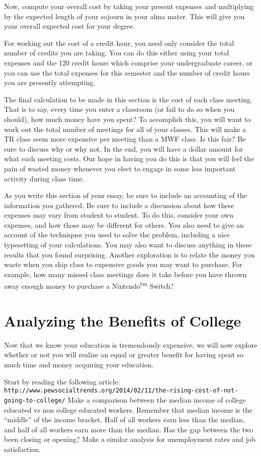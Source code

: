 \documentclass{article}
\begin{document}
Now, compute your overall cost by taking your present expenses and multiplying by the expected length of your sojourn in your alma mater.  This will give you your overall expected cost for your degree.

For working out the cost of a credit hour, you need only consider the total number of credits you are taking.  You can do this either using your total expenses and the 120 credit hours which comprise your undergraduate career, or you can use the total expenses for this semester and the number of credit hours you are presently attempting.

The final calculation to be made in this section is the cost of each class meeting.  That is to say, every time you enter a classroom (or fail to do so when you should), how much money have you spent?  To accomplish this, you will want to work out the total number of meetings for all of your classes.  This will make a TR class seem more expensive per meeting than a MWF class.  Is this fair?  Be sure to discuss why or why not.  In the end, you will have a dollar amount for what each meeting costs.  Our hope in having you do this is that you will feel the pain of wasted money whenever you elect to engage in some less important activity during class time.

As you write this section of your essay, be sure to include an accounting of the information you gathered.  Be sure to include a discussion about how these expenses may vary from student to student.  To do this, consider your own expenses, and how those may be different for others.  You also need to give an account of the techniques you used to solve the problem, including a nice typesetting of your calculations.  You may also want to discuss anything in these results that you found surprising.  Another exploration is to relate the money you waste when you skip class to expensive goods you may want to purchase.  For example, how many missed class meetings does it take before you have thrown away enough money to purchase a Nintendo\textsuperscript{tm} Switch?

\section*{Analyzing the Benefits of College}
Now that we know your education is tremendously expensive, we will now explore
whether or not you will realize an equal or greater benefit for having spent
so much time and money acquiring your education.

Start by reading the following article:\newline
{\footnotesize\tt http://www.pewsocialtrends.org/2014/02/11/the-rising-cost-of-not-going-to-college/}\newline
Make a comparison between the median income of college educated vs non college educated 
workers.  Remember that median income is the ``middle'' of the income bracket.  Half 
of all workers earn less than the median, and half of all workers earn more than the median.
Has the gap between the two been closing or opening?   Make a similar analysis for unemployment rates and job satisfaction.  
\end{document}
